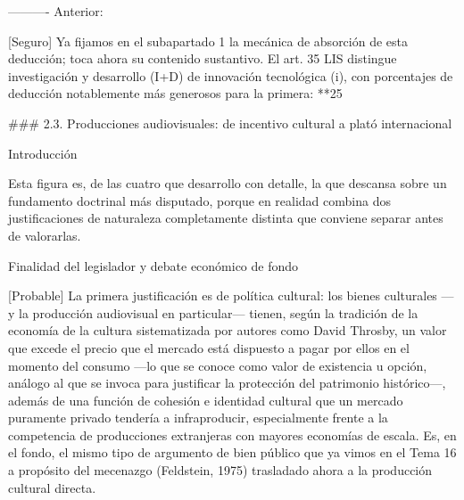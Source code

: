 \documentclass[10pt,a4paper]{article}
\begin{document}
---------- Anterior:

[Seguro] Ya fijamos en el subapartado 1 la mecánica de absorción de esta deducción; toca ahora su contenido sustantivo. El art. 35 LIS distingue investigación y desarrollo (I+D) de innovación tecnológica (i), con porcentajes de deducción notablemente más generosos para la primera: **25%

### 2.3. Producciones audiovisuales: de incentivo cultural a plató internacional

Introducción

Esta figura es, de las cuatro que desarrollo con detalle, la que descansa sobre un fundamento doctrinal más disputado, porque en realidad combina dos justificaciones de naturaleza completamente distinta que conviene separar antes de valorarlas.

Finalidad del legislador y debate económico de fondo

[Probable] La primera justificación es de política cultural: los bienes culturales —y la producción audiovisual en particular— tienen, según la tradición de la economía de la cultura sistematizada por autores como David Throsby, un valor que excede el precio que el mercado está dispuesto a pagar por ellos en el momento del consumo —lo que se conoce como valor de existencia u opción, análogo al que se invoca para justificar la protección del patrimonio histórico—, además de una función de cohesión e identidad cultural que un mercado puramente privado tendería a infraproducir, especialmente frente a la competencia de producciones extranjeras con mayores economías de escala. Es, en el fondo, el mismo tipo de argumento de bien público que ya vimos en el Tema 16 a propósito del mecenazgo (Feldstein, 1975) trasladado ahora a la producción cultural directa.
\end{document}
